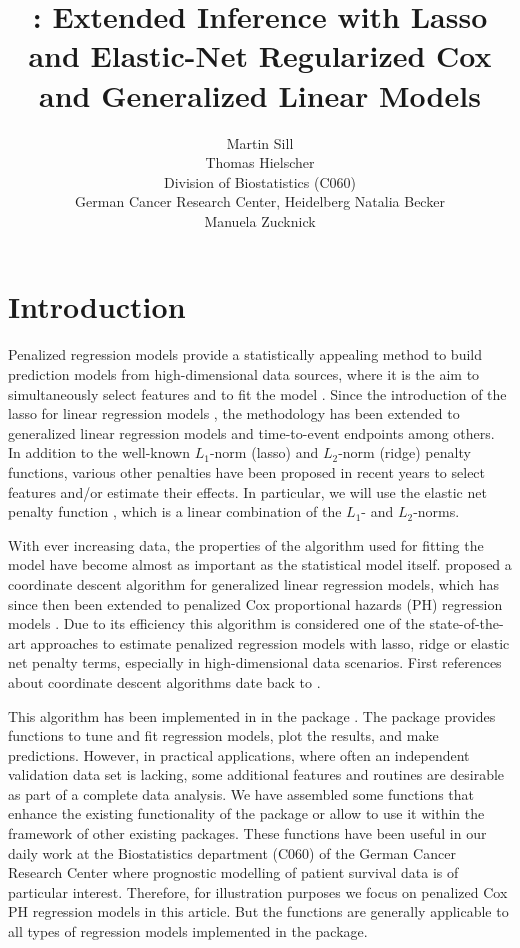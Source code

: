 \documentclass[nojss]{jss}
\author{Martin Sill\\
\And Thomas Hielscher\\ \hspace{3.95 cm} Division of Biostatistics (C060) \\  \hspace{4.3 cm} German Cancer Research Center, Heidelberg
\And Natalia Becker\\
\And Manuela Zucknick\\}
\title{\pkg{c060}: Extended Inference with Lasso and Elastic-Net Regularized Cox and Generalized Linear Models}
\begin{document}


\section{Introduction}
\label{intro}

Penalized regression models provide a statistically appealing method to build prediction models from high-dimensional data sources, where it is the aim to simultaneously select features and to fit the model \citep{fan2010,benner2010}. Since the introduction of the lasso for linear regression models \citep{tibshirani96}, the methodology has been extended to generalized linear regression models and time-to-event endpoints \citep{tibshirani97} among others. In addition to the well-known $L_1$-norm (lasso) and $L_2$-norm (ridge) penalty functions, various other penalties have been proposed in recent years to select features and/or estimate their effects. In particular, we will use the elastic net penalty function \citep{zou05}, which is a linear combination of the $L_1$- and $L_2$-norms.

With ever increasing data, the properties of the algorithm used for fitting the model have become almost as important as the statistical model itself. 
\citet{FHT2010} proposed a coordinate descent algorithm for generalized linear regression models, which has since then been extended to penalized Cox proportional hazards (PH) regression models \citep{simon2011}. Due to its efficiency this algorithm is considered one of the state-of-the-art
approaches to estimate penalized regression models with lasso, ridge or elastic net penalty terms, especially in high-dimensional data scenarios. 
First references about coordinate descent algorithms date back to \citet{Fu98}. %

This algorithm has been implemented in  \citep{R11} in the  package \citep{glmnet}. The package provides functions to tune and fit regression models, plot the results, and make predictions. However, in practical applications, where often an independent validation data set is lacking, some additional features and routines are desirable as part of a complete data analysis. We have assembled some functions that enhance the existing functionality of the  package or
allow to use it within the framework of other existing  packages. These functions have been useful in our daily work at the
Biostatistics department (C060) of the German Cancer Research Center where prognostic modelling of patient survival data is of particular interest. Therefore, for illustration purposes we focus on penalized Cox PH regression models in this article. But the  functions are generally applicable to all types of regression models implemented in the  package.
\end{document}
